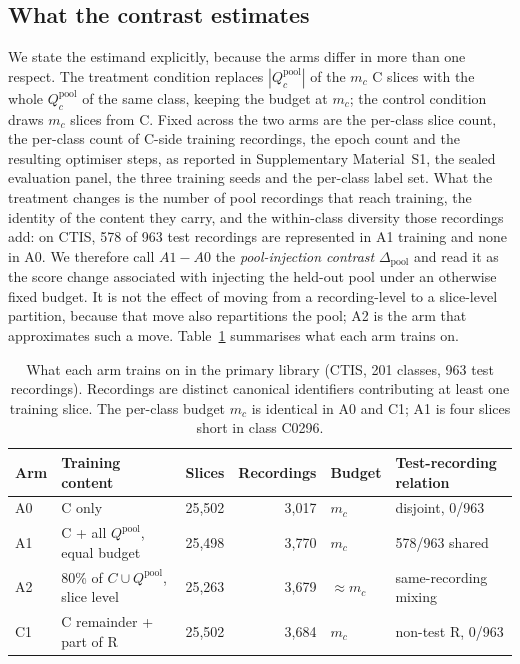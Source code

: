 \subsection{What the contrast estimates}\label{sec:estimand}

We state the estimand explicitly, because the arms differ in more than one respect.
The treatment condition replaces $|Q^{\text{pool}}_c|$ of the $m_c$ C slices with the whole
$Q^{\text{pool}}_c$ of the same class, keeping the budget at $m_c$; the control condition draws
$m_c$ slices from C.
Fixed across the two arms are the per-class slice count, the per-class count of C-side training
recordings, the epoch count and the resulting optimiser steps, as reported in Supplementary Material~S1, the sealed evaluation panel, the three training seeds and
the per-class label set. What the treatment changes is the number of pool recordings that reach
training, the identity of the content they carry, and the within-class diversity those recordings
add: on CTIS, 578 of 963 test recordings are represented in A1 training and none in A0.
We therefore call $A1-A0$ the \emph{pool-injection contrast} $\Delta_{\text{pool}}$ and read it as
the score change associated with injecting the held-out pool under an otherwise fixed budget.
It is not the effect of moving from a recording-level to a slice-level partition, because that
move also repartitions the pool; A2 is the arm that approximates such a move.
Table~\ref{tab:arms} summarises what each arm trains on.

\begin{table}[t]
\centering\footnotesize\setlength{\tabcolsep}{4pt}
\caption{What each arm trains on in the primary library (CTIS, 201 classes, 963 test
recordings). Recordings are distinct canonical identifiers contributing at least one training
slice. The per-class budget $m_c$ is identical in A0 and C1; A1 is four slices short in class C0296.}
\label{tab:arms}
\begin{tabular}{@{}llrrll@{}}\toprule
Arm & Training content & Slices & Recordings & Budget & Test-recording relation\\\midrule
A0 & C only & 25{,}502 & 3{,}017 & $m_c$ & disjoint, 0/963\\
A1 & C + all $Q^{\text{pool}}$, equal budget & 25{,}498 & 3{,}770 & $m_c$ & 578/963 shared\\
A2 & 80\% of $C\cup Q^{\text{pool}}$, slice level & 25{,}263 & 3{,}679 & $\approx m_c$ & same-recording mixing\\
C1 & C remainder + part of R & 25{,}502 & 3{,}684 & $m_c$ & non-test R, 0/963\\\bottomrule
\end{tabular}\end{table}

